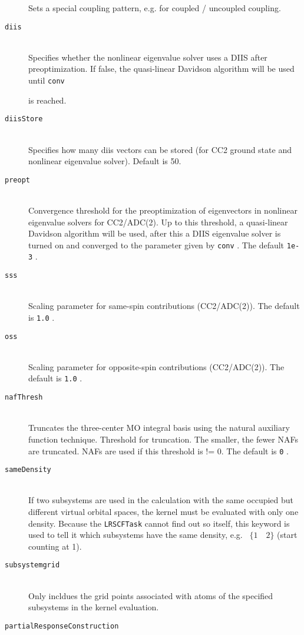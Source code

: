 \documentclass[bibliography=totocnumbered,a4paper,10pt,oneside]{scrbook}
\newcommand{\ttt}[1]{%
  \begingroup\setlength{\fboxsep}{1pt}%
  \colorbox{serenity-green!30}{\texttt{\hspace*{2pt}\vphantom{(g}#1\hspace*{2pt}}}%
  \endgroup
}
\begin{document}
\begin{description}
    Sets a special coupling pattern, e.g. for coupled / uncoupled coupling.
    \item[\texttt{diis}]\hfill\\
    Specifies whether the nonlinear eigenvalue solver uses a DIIS after preoptimization. If false, the quasi-linear Davidson algorithm will be used until \ttt{conv}
    is reached.
    \item[\texttt{diisStore}]\hfill\\
    Specifies how many diis vectors can be stored (for CC2 ground state and nonlinear
    eigenvalue solver). Default is 50.
    \item[\texttt{preopt}]\hfill\\
    Convergence threshold for the preoptimization of eigenvectors in nonlinear
    eigenvalue solvers for CC2/ADC(2). Up to this threshold, a quasi-linear
    Davidson algorithm will be used, after this a DIIS eigenvalue solver 
    is turned on and converged to the parameter given by \ttt{conv}. The default \ttt{1e-3}.
    \item[\texttt{sss}]\hfill\\
    Scaling parameter for same-spin contributions (CC2/ADC(2)). The default is \ttt{1.0}.
    \item[\texttt{oss}]\hfill\\
    Scaling parameter for opposite-spin contributions (CC2/ADC(2)). The default is \ttt{1.0}.
    \item[\texttt{nafThresh}]\hfill\\
    Truncates the three-center MO integral basis using the natural auxiliary function technique.
    Threshold for truncation. The smaller, the fewer NAFs are truncated. NAFs are used if this 
    threshold is != 0. The default is \ttt{0}.
    \item[\texttt{sameDensity}]\hfill\\
    If two subsystems are used in the calculation with the same occupied but different virtual orbital spaces,
    the kernel must be evaluated with only one density. Because the \ttt{LRSCFTask} cannot find out so itself,
    this keyword is used to tell it which subsystems have the same density, e.g.~\ttt{$\{1\quad 2\}$} (start counting at 1).
    \item[\texttt{subsystemgrid}]\hfill\\
    Only incldues the grid points associated with atoms of the specified subsystems in the kernel evaluation.
    \item[\texttt{partialResponseConstruction}]\hfill\\

\end{description}
\end{document}
